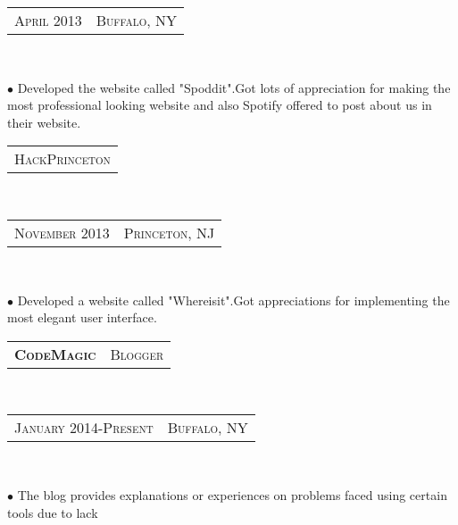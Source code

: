 \documentclass[10pt,a4paper,oneside]{article}
\begin{document}
\begin{minipage}[t]{0.33\textwidth}
{\begin{tabular}{c|c}
                {\small A\textsc{pril 2013}}
                &{\small B\textsc{uffalo}, NY}
            \end{tabular}
        }\\
        \vspace{-12pt}
        \begin{adjustwidth}{7pt}{0pt}
            {\footnotesize  $\bullet$ Developed the website called "Spoddit".Got lots of appreciation for 
            making the most professional looking website and also Spotify offered to post
            about us in their website.}\\
        \end{adjustwidth}
        \vspace{-6pt}
        \begin{tabular}{c}
            {\small H\textsc{ack}P\textsc{rinceton}}
        \end{tabular}\\
        \textcolor{light-gray}{
            \begin{tabular}{c|c}
                {\small N\textsc{ovember 2013}}
                &{\small P\textsc{rinceton}, NJ}
            \end{tabular}
        }\\
        \vspace{-12pt}
        \begin{adjustwidth}{7pt}{0pt}
            {\footnotesize $\bullet$ Developed a website called "Whereisit".Got appreciations for implementing  the
            most elegant user interface.}\\
        \end{adjustwidth}
        \begin{tabular}{c|c}
            \textbf{\normalsize C\textsc{ode}M\textsc{agic}}
            &\textmd{\normalsize B\textsc{logger}}
        \end{tabular}\\
        \textcolor{light-gray}{
            \begin{tabular}{c|c}
                {\small J\textsc{anuary 2014}-P\textsc{resent}}
                &{\small B\textsc{uffalo}, NY}
            \end{tabular}
        }\\ 
        \vspace{-4mm}
        \begin{adjustwidth}{7pt}{0pt}
            {\footnotesize $\bullet$ The blog provides explanations or experiences on problems faced using certain tools due to lack
}
\end{adjustwidth}
\end{minipage}
\end{document}
